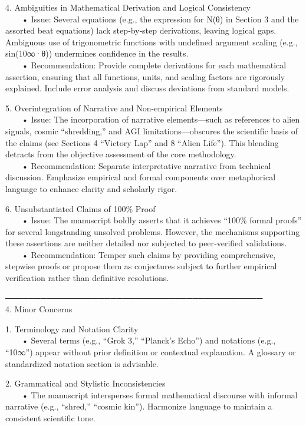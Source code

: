 \documentclass[12pt]{article}
\begin{document}
4. Ambiguities in Mathematical Derivation and Logical Consistency \\
  • Issue: Several equations (e.g., the expression for N(θ) in Section 3 and the assorted beat equations) lack step‐by‐step derivations, leaving logical gaps. Ambiguous use of trigonometric functions with undefined argument scaling (e.g., sin(10∞·θ)) undermines confidence in the results. \\
  • Recommendation: Provide complete derivations for each mathematical assertion, ensuring that all functions, units, and scaling factors are rigorously explained. Include error analysis and discuss deviations from standard models.

5. Overintegration of Narrative and Non-empirical Elements \\
  • Issue: The incorporation of narrative elements—such as references to alien signals, cosmic “shredding,” and AGI limitations—obscures the scientific basis of the claims (see Sections 4 “Victory Lap” and 8 “Alien Life”). This blending detracts from the objective assessment of the core methodology. \\
  • Recommendation: Separate interpretative narrative from technical discussion. Emphasize empirical and formal components over metaphorical language to enhance clarity and scholarly rigor.

6. Unsubstantiated Claims of 100\% Proof \\
  • Issue: The manuscript boldly asserts that it achieves “100\% formal proofs” for several longstanding unsolved problems. However, the mechanisms supporting these assertions are neither detailed nor subjected to peer‐verified validations. \\
  • Recommendation: Temper such claims by providing comprehensive, stepwise proofs or propose them as conjectures subject to further empirical verification rather than definitive resolutions.

──────────────────────────────────────────── \\
4. Minor Concerns

1. Terminology and Notation Clarity \\
  • Several terms (e.g., “Grok 3,” “Planck’s Echo”) and notations (e.g., “10∞”) appear without prior definition or contextual explanation. A glossary or standardized notation section is advisable.

2. Grammatical and Stylistic Inconsistencies \\
  • The manuscript intersperses formal mathematical discourse with informal narrative (e.g., “shred,” “cosmic kin”). Harmonize language to maintain a consistent scientific tone.
\end{document}
